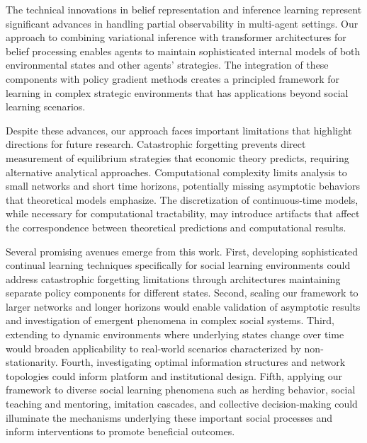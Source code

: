 The technical innovations in belief representation and inference learning represent significant advances in handling partial observability in multi-agent settings. Our approach to combining variational inference with transformer architectures for belief processing enables agents to maintain sophisticated internal models of both environmental states and other agents' strategies. The integration of these components with policy gradient methods creates a principled framework for learning in complex strategic environments that has applications beyond social learning scenarios.

Despite these advances, our approach faces important limitations that highlight directions for future research. Catastrophic forgetting prevents direct measurement of equilibrium strategies that economic theory predicts, requiring alternative analytical approaches. Computational complexity limits analysis to small networks and short time horizons, potentially missing asymptotic behaviors that theoretical models emphasize. The discretization of continuous-time models, while necessary for computational tractability, may introduce artifacts that affect the correspondence between theoretical predictions and computational results.

Several promising avenues emerge from this work. First, developing sophisticated continual learning techniques specifically for social learning environments could address catastrophic forgetting limitations through architectures maintaining separate policy components for different states. Second, scaling our framework to larger networks and longer horizons would enable validation of asymptotic results and investigation of emergent phenomena in complex social systems. Third, extending to dynamic environments where underlying states change over time would broaden applicability to real-world scenarios characterized by non-stationarity. Fourth, investigating optimal information structures and network topologies could inform platform and institutional design. Fifth, applying our framework to diverse social learning phenomena such as herding behavior, social teaching and mentoring, imitation cascades, and collective decision-making could illuminate the mechanisms underlying these important social processes and inform interventions to promote beneficial outcomes.

